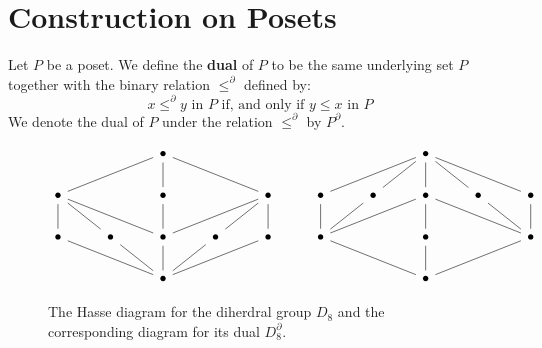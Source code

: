 \section{Construction on Posets}
\label{section_1.4}

\begin{definition}
  Let $P$ be a poset. We define the \textbf{dual} of $P$ to be the
  same underlying set $P$ together with the binary relation
  $\leq^\partial$ defined by:
  \begin{equation*}
    x \leq^\partial y \text{ in } P \text{ if, and only if }
    y \leq x \text{ in } P
  \end{equation*}
  We denote the dual of $P$ under the relation $\leq^\partial$ by
  $P^\partial$.
\end{definition}

\begin{figure}[h]
  \centering
  \[\begin{tikzcd}
    && \bullet &&&&& \bullet \\
    \bullet && \bullet && \bullet & \bullet & \bullet & \bullet & \bullet & \bullet \\
    \bullet & \bullet & \bullet & \bullet & \bullet & \bullet && \bullet && \bullet \\
    && \bullet &&&&& \bullet
    \arrow[no head, from=1-8, to=2-6]
    \arrow[no head, from=1-8, to=2-7]
    \arrow[no head, from=1-8, to=2-8]
    \arrow[no head, from=1-8, to=2-9]
    \arrow[no head, from=1-8, to=2-10]
    \arrow[no head, from=2-1, to=1-3]
    \arrow[no head, from=2-3, to=1-3]
    \arrow[no head, from=2-5, to=1-3]
    \arrow[no head, from=2-7, to=3-6]
    \arrow[no head, from=2-8, to=3-8]
    \arrow[no head, from=2-8, to=3-10]
    \arrow[no head, from=2-9, to=3-10]
    \arrow[no head, from=2-10, to=3-10]
    \arrow[no head, from=3-1, to=2-1]
    \arrow[no head, from=3-2, to=2-1]
    \arrow[no head, from=3-3, to=2-1]
    \arrow[no head, from=3-3, to=2-3]
    \arrow[no head, from=3-3, to=2-5]
    \arrow[no head, from=3-4, to=2-5]
    \arrow[no head, from=3-5, to=2-5]
    \arrow[no head, from=3-6, to=2-6]
    \arrow[no head, from=3-6, to=2-8]
    \arrow[no head, from=3-8, to=4-8]
    \arrow[no head, from=3-10, to=4-8]
    \arrow[no head, from=4-3, to=3-1]
    \arrow[no head, from=4-3, to=3-2]
    \arrow[no head, from=4-3, to=3-3]
    \arrow[no head, from=4-3, to=3-4]
    \arrow[no head, from=4-3, to=3-5]
    \arrow[no head, from=4-8, to=3-6]
  \end{tikzcd}\]
  \caption{The Hasse diagram for the diherdral group $D_8$ and the
  corresponding diagram for its dual $D_8^\partial$.}
  \label{}
\end{figure}

